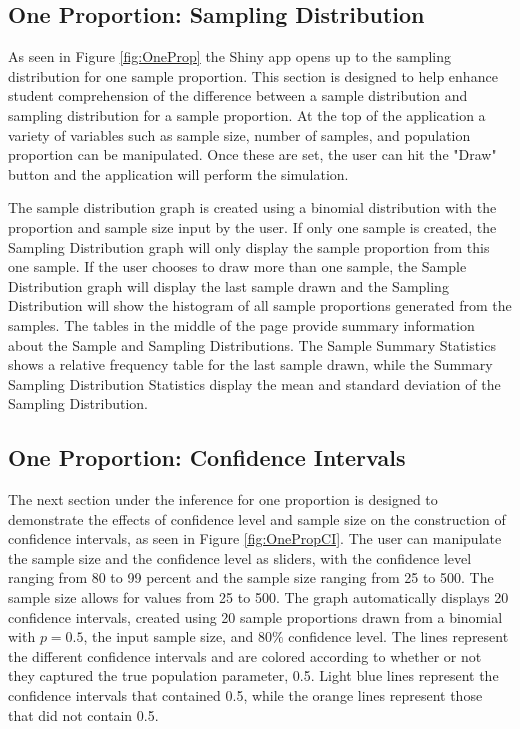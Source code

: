 \documentclass[11pt]{book}
\begin{document}
\subsection{One Proportion: Sampling Distribution}
As seen in Figure \ref{fig:OneProp} the Shiny app opens up to the sampling distribution for one sample proportion. This section is designed to help enhance student comprehension of the difference between a sample distribution and sampling distribution for a sample proportion. At the top of the application a variety of variables such as sample size, number of samples, and population proportion can be manipulated. Once these are set, the user can hit the "Draw" button and the application will perform the simulation. 

The sample distribution graph is created using a binomial distribution with the proportion and sample size input by the user. If only one sample is created, the Sampling Distribution graph will only display the sample proportion from this one sample. If the user chooses to draw more than one sample, the Sample Distribution graph will display the last sample drawn and the Sampling Distribution will show the histogram of all sample proportions generated from the samples. The tables in the middle of the page provide summary information about the Sample and Sampling Distributions. The Sample Summary Statistics shows a relative frequency table for the last sample drawn, while the Summary Sampling Distribution Statistics display the mean and standard deviation of the Sampling Distribution. 

\subsection{One Proportion: Confidence Intervals}
The next section under the inference for one proportion is designed to demonstrate the effects of confidence level and sample size on the construction of confidence intervals, as seen in Figure \ref{fig:OnePropCI}. The user can manipulate the sample size and the confidence level as sliders, with the confidence level ranging from 80 to 99 percent and the sample size ranging from 25 to 500. The sample size allows for values from 25 to 500.  The graph automatically displays 20 confidence intervals, created using 20 sample proportions drawn from a binomial with $p= 0.5$, the input sample size, and $80\%$ confidence level. The lines represent the different confidence intervals and are colored according to whether or not they captured the true population parameter, 0.5.  Light blue lines represent the confidence intervals that contained 0.5, while the orange lines represent those that did not contain 0.5. 
\end{document}
